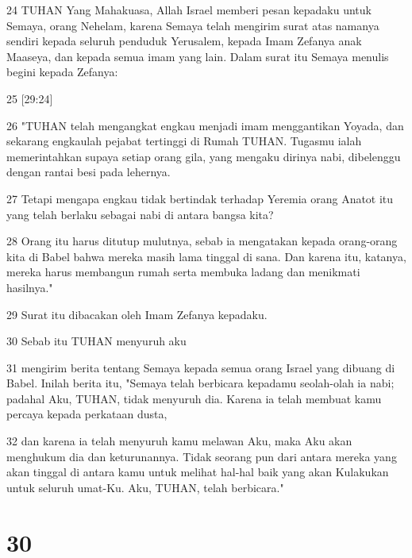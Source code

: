 \par 24 TUHAN Yang Mahakuasa, Allah Israel memberi pesan kepadaku untuk Semaya, orang Nehelam, karena Semaya telah mengirim surat atas namanya sendiri kepada seluruh penduduk Yerusalem, kepada Imam Zefanya anak Maaseya, dan kepada semua imam yang lain. Dalam surat itu Semaya menulis begini kepada Zefanya:
\par 25 [29:24]
\par 26 "TUHAN telah mengangkat engkau menjadi imam menggantikan Yoyada, dan sekarang engkaulah pejabat tertinggi di Rumah TUHAN. Tugasmu ialah memerintahkan supaya setiap orang gila, yang mengaku dirinya nabi, dibelenggu dengan rantai besi pada lehernya.
\par 27 Tetapi mengapa engkau tidak bertindak terhadap Yeremia orang Anatot itu yang telah berlaku sebagai nabi di antara bangsa kita?
\par 28 Orang itu harus ditutup mulutnya, sebab ia mengatakan kepada orang-orang kita di Babel bahwa mereka masih lama tinggal di sana. Dan karena itu, katanya, mereka harus membangun rumah serta membuka ladang dan menikmati hasilnya."
\par 29 Surat itu dibacakan oleh Imam Zefanya kepadaku.
\par 30 Sebab itu TUHAN menyuruh aku
\par 31 mengirim berita tentang Semaya kepada semua orang Israel yang dibuang di Babel. Inilah berita itu, "Semaya telah berbicara kepadamu seolah-olah ia nabi; padahal Aku, TUHAN, tidak menyuruh dia. Karena ia telah membuat kamu percaya kepada perkataan dusta,
\par 32 dan karena ia telah menyuruh kamu melawan Aku, maka Aku akan menghukum dia dan keturunannya. Tidak seorang pun dari antara mereka yang akan tinggal di antara kamu untuk melihat hal-hal baik yang akan Kulakukan untuk seluruh umat-Ku. Aku, TUHAN, telah berbicara."

\chapter{30}

